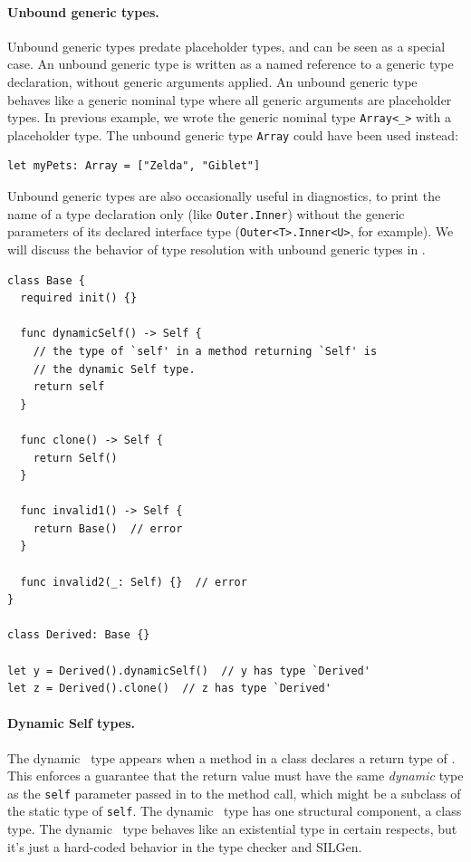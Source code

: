\documentclass[../generics]{subfiles}
\begin{document}
\paragraph{Unbound generic types.}
Unbound generic types predate placeholder types, and can be seen as a special case. An unbound generic type is written as a named reference to a generic type declaration, without generic arguments applied. An unbound generic type behaves like a generic nominal type where all generic arguments are placeholder types. In previous example, we wrote the generic nominal type \verb|Array<_>| with a placeholder type. The unbound generic type \texttt{Array} could have been used instead:
\begin{Verbatim}
let myPets: Array = ["Zelda", "Giblet"]
\end{Verbatim}
Unbound generic types are also occasionally useful in diagnostics, to print the name of a type declaration only (like \texttt{Outer.Inner}) without the generic parameters of its declared interface type (\texttt{Outer<T>.Inner<U>}, for example). We will discuss the behavior of type resolution with unbound generic types in .

\begin{listing}\label{dynamic self example}
\begin{Verbatim}
class Base {
  required init() {}

  func dynamicSelf() -> Self {
    // the type of `self' in a method returning `Self' is
    // the dynamic Self type.
    return self
  }

  func clone() -> Self {
    return Self()
  }

  func invalid1() -> Self {
    return Base()  // error
  }

  func invalid2(_: Self) {}  // error
}

class Derived: Base {}

let y = Derived().dynamicSelf()  // y has type `Derived'
let z = Derived().clone()  // z has type `Derived'
\end{Verbatim}
\end{listing}

\paragraph{Dynamic Self types.}
The dynamic \tSelf\ type appears when a method in a class declares a return type of \tSelf. This enforces a guarantee that the return value must have the same \emph{dynamic} type as the \texttt{self} parameter passed in to the method call, which might be a subclass of the static type of \texttt{self}. The dynamic \tSelf\ type has one structural component, a class type. The dynamic \tSelf\ type behaves like an existential type in certain respects, but it's just a hard-coded behavior in the type checker and SILGen.
\end{document}
